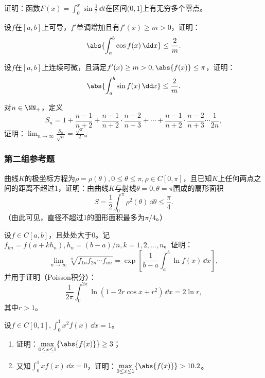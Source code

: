 \begin{xreferenceproblem}[12]
证明：函数$F(x)=\int_0^x\sin\frac1t\,\dd t$在区间$(0,1]$上有无穷多个零点。
\end{xreferenceproblem}

\begin{xreferenceproblem}[13]
设$f$在$[a,b]$上可导，$f'$单调增加且有$f'(x)\ge m>0$，证明：
  \[
    \abs{\int_a^b\cos f(x)\,\dd x}\le\frac2m.
  \]
\end{xreferenceproblem}

\begin{xreferenceproblem}[14]
设$f$在$[a,b]$上连续可微，且满足$f'(x)\ge m>0,\abs{f(x)}\le\pi$，证明：
  \[
    \abs{\int_a^b\sin f(x)\,\dd x}\le\frac2m.
  \]
\end{xreferenceproblem}

\begin{xreferenceproblem}[15]
对$n\in\NN_+$，定义
  \[
    S_n=1+\frac{n-1}{n+2}
    +\frac{n-1}{n+2}\cdot\frac{n-2}{n+3}
    +\cdots+
    \frac{n-1}{n+2}\cdot\frac{n-2}{n+3}\cdots\frac1{2n},
  \]
  证明：$\displaystyle\lim_{n\to\infty}\frac{S_n}{\sqrt n}=\frac{\sqrt\pi}{2}$。
\end{xreferenceproblem}

\subsubsection*{第二组参考题}

\begin{xreferenceproblem}[1]
曲线$K$的极坐标方程为$\rho=\rho(\theta),0\le\theta\le\pi,\rho\in C[0,\pi]$，且已知$K$上任何两点之间的距离不超过1，证明：由曲线$K$与射线$\theta=0,\theta=\pi$围成的扇形面积
  \[
    S=\frac12\int_0^\pi\rho^2(\theta)\,\dd\theta\le\frac\pi4.
  \]
  （由此可见，直径不超过1的图形面积最多为$\pi/4$。）
\end{xreferenceproblem}

\begin{xreferenceproblem}[2]
设$f\in C[a,b]$，且处处大于0。记$f_{kn}=f(a+kh_n),h_n=(b-a)/n,k=1,2,\ldots,n$。证明：
  \[
    \lim_{n\to\infty}\sqrt[n]{f_{1n}f_{2n}\cdots f_{nn}}
    =\exp\left[\frac1{b-a}\int_a^b\ln f(x)\,\dd x\right],
  \]
  并用于证明（Poisson积分）：
  \[
    \frac1{2\pi}\int_0^{2\pi}\ln(1-2r\cos x+r^2)\,\dd x=2\ln r,
  \]
  其中$r>1$。
\end{xreferenceproblem}

\begin{xreferenceproblem}[3]
设$f\in C[0,1],\int_0^1x^2f(x)\,\dd x=1$。
  \begin{enumerate}[label=(\arabic*)]
    \item 证明：$\displaystyle\max_{0\le x\le1}\{\abs{f(x)}\}\ge3$；
    \item 又知$\int_0^1xf(x)\,\dd x=0$，证明：$\displaystyle\max_{0\le x\le1}\{\abs{f(x)}\}>10.2$。
  \end{enumerate}
\end{xreferenceproblem}

